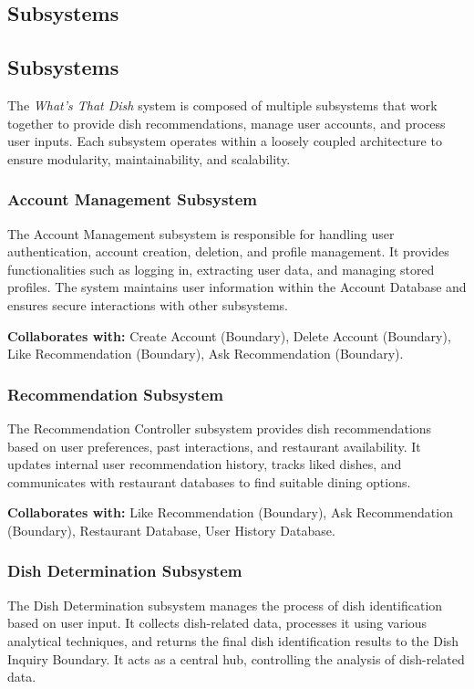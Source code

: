 \documentclass[]{article}
\begin{document}
\subsection{Subsystems}
\label{sub:subsystems}
\subsection{Subsystems}

The \textit{What’s That Dish} system is composed of multiple subsystems that work together to provide dish recommendations, manage user accounts, and process user inputs. Each subsystem operates within a loosely coupled architecture to ensure modularity, maintainability, and scalability.

\subsubsection{Account Management Subsystem}
The Account Management subsystem is responsible for handling user authentication, account creation, deletion, and profile management. It provides functionalities such as logging in, extracting user data, and managing stored profiles. The system maintains user information within the Account Database and ensures secure interactions with other subsystems.

\textbf{Collaborates with:} Create Account (Boundary), Delete Account (Boundary), Like Recommendation (Boundary), Ask Recommendation (Boundary).

\subsubsection{Recommendation Subsystem}
The Recommendation Controller subsystem provides dish recommendations based on user preferences, past interactions, and restaurant availability. It updates internal user recommendation history, tracks liked dishes, and communicates with restaurant databases to find suitable dining options.

\textbf{Collaborates with:} Like Recommendation (Boundary), Ask Recommendation (Boundary), Restaurant Database, User History Database.

\subsubsection{Dish Determination Subsystem}
The Dish Determination subsystem manages the process of dish identification based on user input. It collects dish-related data, processes it using various analytical techniques, and returns the final dish identification results to the Dish Inquiry Boundary. It acts as a central hub, controlling the analysis of dish-related data.
\end{document}

